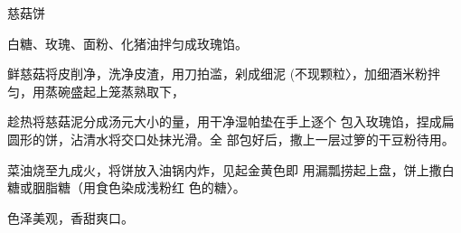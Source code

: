\begin{recipe}{慈菇饼}

\ingredients


\cooking

\step 	白糖、玫瑰、面粉、化猪油拌匀成玫瑰馅。

\step 	鲜慈菇将皮削净，洗净皮渣，用刀拍滥，剁成细泥 (不现颗粒〉，加细酒米粉拌匀，用蒸碗盛起上笼蒸熟取下，

趁热将慈菇泥分成汤元大小的量，用干净湿帕垫在手上逐个 包入玫瑰馅，捏成扁圆形的饼，沾清水将交口处抹光滑。全 部包好后，撒上一层过箩的干豆粉待用。

菜油烧至九成火，将饼放入油锅内炸，见起金黄色即 用漏瓢捞起上盘，饼上撒白糖或胭脂糖（用食色染成浅粉红 色的糖〉。	

\notes

色泽美观，香甜爽口。

\end{recipe}

